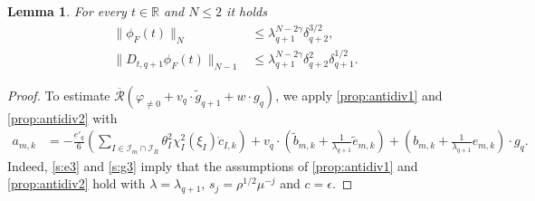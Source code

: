 \documentclass[10pt,a4paper]{amsart}
\numberwithin{equation}{section}
\numberwithin{corollario}{section}
\newtheorem{lemma}{Lemma}
\numberwithin{lemma}{section}
\numberwithin{prop}{section}
\theoremstyle{definition}
\theoremstyle{remark}
\newcommand{\R}{\mathbb{R}}
\newcommand{\qq}{_{q+1}}
\begin{document}
\begin{lemma}\label{lemma:phiF}
For every $t \in \R$ and $N\le 2$ it holds 
    \begin{align} 
        \|\phi_F(t)\|_N&\le \lambda\qq ^{N-2\gamma}\delta_{q+2}^{3/2},
        \\
        \|D_{t,q+1}\phi_F(t)\|_{N-1}&\le \lambda\qq ^{N-2\gamma}\delta_{q+2}^{2}\delta\qq^{1/2} .
    \end{align}  
\end{lemma}
\begin{proof}
To estimate $\overline{\mathcal{R}}(\varphi_{\neq 0}+v_q\cdot \tilde{g}\qq+w\cdot g_q)$, we apply \autoref{prop:antidiv1} and \autoref{prop:antidiv2} with 
\begin{equation} \label{eq:overlineAmk}
\begin{aligned}
    a_{m,k}&=-\frac{e'_q}{6}\left(\sum_{I \in \mathcal{I}_m \cap \mathcal{I}_R} \theta_I^2 \chi_I^2 (\xi_I) \mathring{c}_{I,k}\right)+v_q \cdot\left(\tilde{b}_{m,k} + \frac{1}{\lambda\qq} \tilde{e}_{m,k}  \right)
    +\left({b}_{m,k} + \frac{1}{\lambda\qq}  {e}_{m,k}  \right) \cdot g_q.
\end{aligned}
\end{equation}
Indeed, \eqref{s:e3} and \eqref{s:g3} imply that the assumptions of \autoref{prop:antidiv1} and \autoref{prop:antidiv2} hold with $\lambda=\lambda\qq$, $s_j=\rho^{1/2}\mu^{-j}$ and $c=\epsilon.$
 

\end{proof}
\end{document}
